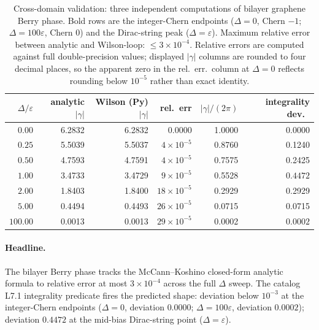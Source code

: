 \documentclass[11pt,letterpaper]{article}
\begin{document}
\begin{table}[h]
\centering
\small
\begin{tabular}{rrrrrr}
\toprule
$\Delta/\varepsilon$ & analytic $|\gamma|$ & Wilson (Py) $|\gamma|$
& rel.\ err & $|\gamma|/(2\pi)$ & integrality dev.\ \\
\midrule
$0.00$    & 6.2832 & 6.2832 & 0.0000 & 1.0000 & $\mathbf{0.0000}$ \\
$0.25$    & 5.5039 & 5.5037 & $4 \times 10^{-5}$  & 0.8760 & 0.1240 \\
$0.50$    & 4.7593 & 4.7591 & $4 \times 10^{-5}$  & 0.7575 & 0.2425 \\
$1.00$    & 3.4733 & 3.4729 & $9 \times 10^{-5}$  & 0.5528 & $\mathbf{0.4472}$ \\
$2.00$    & 1.8403 & 1.8400 & $18 \times 10^{-5}$ & 0.2929 & 0.2929 \\
$5.00$    & 0.4494 & 0.4493 & $26 \times 10^{-5}$ & 0.0715 & 0.0715 \\
$100.00$  & 0.0013 & 0.0013 & $29 \times 10^{-5}$ & 0.0002 & $\mathbf{0.0002}$ \\
\bottomrule
\end{tabular}
\caption{Cross-domain validation: three independent computations of
bilayer graphene Berry phase. Bold rows are the integer-Chern
endpoints ($\Delta = 0$, Chern $-1$; $\Delta = 100\varepsilon$,
Chern $0$) and the Dirac-string peak ($\Delta = \varepsilon$).
Maximum relative error between analytic and Wilson-loop:
$\leq 3 \times 10^{-4}$. Relative errors are computed against full
double-precision values; displayed $|\gamma|$ columns are rounded
to four decimal places, so the apparent zero in the rel.\ err.\
column at $\Delta = 0$ reflects rounding below $10^{-5}$ rather than
exact identity.}
\label{tab:dpu-validation}
\end{table}

\paragraph{Headline.}
The bilayer Berry phase tracks the McCann--Koshino closed-form
analytic formula to relative error at most $3 \times 10^{-4}$ across
the full $\Delta$ sweep. The catalog L7.1 integrality predicate
fires the predicted shape: deviation below $10^{-3}$ at the
integer-Chern endpoints ($\Delta = 0$, deviation $0.0000$; $\Delta =
100\varepsilon$, deviation $0.0002$); deviation
$\mathbf{0.4472}$ at the mid-bias Dirac-string point
($\Delta = \varepsilon$).
\end{document}
